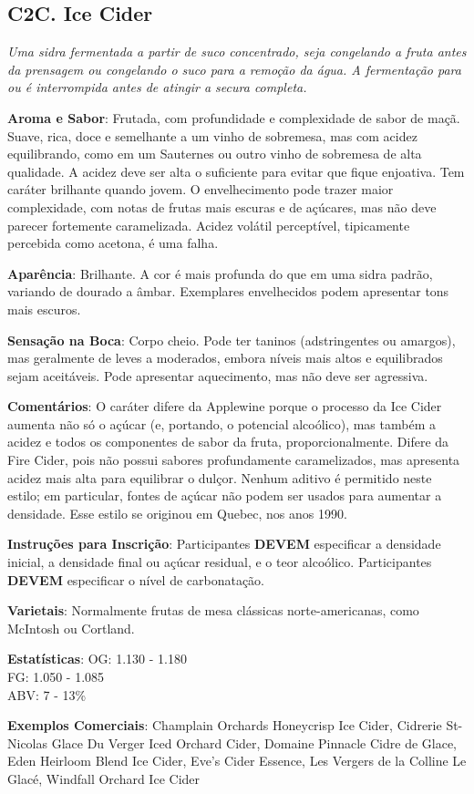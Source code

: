 \subsection*{C2C. Ice Cider}

\textit{Uma sidra fermentada a partir de suco concentrado, seja congelando a fruta antes da prensagem ou congelando o suco para a remoção da água. A fermentação para ou é interrompida antes de atingir a secura completa.}

\textbf{Aroma e Sabor}: Frutada, com profundidade e complexidade de sabor de maçã. Suave, rica, doce e semelhante a um vinho de sobremesa, mas com acidez equilibrando, como em um Sauternes ou outro vinho de sobremesa de alta qualidade. A acidez deve ser alta o suficiente para evitar que fique enjoativa. Tem caráter brilhante quando jovem. O envelhecimento pode trazer maior complexidade, com notas de frutas mais escuras e de açúcares, mas não deve parecer fortemente caramelizada. Acidez volátil perceptível, tipicamente percebida como acetona, é uma falha.

\textbf{Aparência}: Brilhante. A cor é mais profunda do que em uma sidra padrão, variando de dourado a âmbar. Exemplares envelhecidos podem apresentar tons mais escuros.

\textbf{Sensação na Boca}: Corpo cheio. Pode ter taninos (adstringentes ou amargos), mas geralmente de leves a moderados, embora níveis mais altos e equilibrados sejam aceitáveis. Pode apresentar aquecimento, mas não deve ser agressiva.

\textbf{Comentários}: O caráter difere da Applewine porque o processo da Ice Cider aumenta não só o açúcar (e, portando, o potencial alcoólico), mas também a acidez e todos os componentes de sabor da fruta, proporcionalmente. Difere da Fire Cider, pois não possui sabores profundamente caramelizados, mas apresenta acidez mais alta para equilibrar o dulçor. Nenhum aditivo é permitido neste estilo; em particular, fontes de açúcar não podem ser usados para aumentar a densidade. Esse estilo se originou em Quebec, nos anos 1990.

\textbf{Instruções para Inscrição}: Participantes \textbf{DEVEM} especificar a densidade inicial, a densidade final ou açúcar residual, e o teor alcoólico. Participantes \textbf{DEVEM} especificar o nível de carbonatação. 

\textbf{Varietais}: Normalmente frutas de mesa clássicas norte-americanas, como McIntosh ou Cortland.

\textbf{Estatísticas}: OG: 1.130 - 1.180 \\
\phantom{ } \hspace{16.5mm} FG: 1.050 - 1.085 \\
\phantom{ } \hspace{16.5mm} ABV: 7 - 13\%

\textbf{Exemplos Comerciais}: Champlain Orchards Honeycrisp Ice Cider, Cidrerie St-Nicolas Glace Du Verger Iced Orchard Cider, Domaine Pinnacle Cidre de Glace, Eden Heirloom Blend Ice Cider, Eve's Cider Essence, Les Vergers de la Colline Le Glacé, Windfall Orchard Ice Cider
